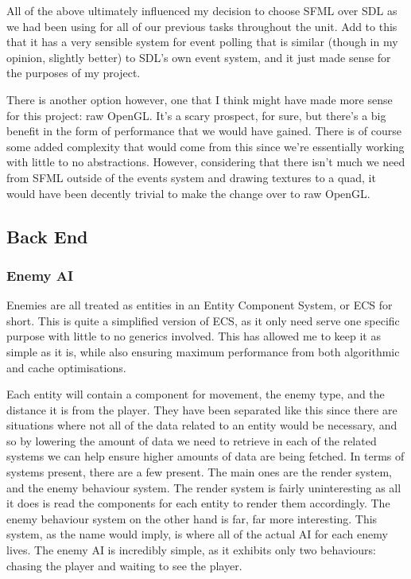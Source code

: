 \documentclass{article}
\begin{document}
All of the above ultimately influenced my decision to choose SFML over SDL as
we had been using for all of our previous tasks throughout the unit. Add to this
that it has a very sensible system for event polling that is similar (though in
my opinion, slightly better) to SDL's own event system, and it just made sense
for the purposes of my project.

There is another option however, one that I think might have made more sense for
this project: raw OpenGL. It's a scary prospect, for sure, but there's a big
benefit in the form of performance that we would have gained. There is of course
some added complexity that would come from this since we're essentially working
with little to no abstractions. However, considering that there isn't much we
need from SFML outside of the events system and drawing textures to a quad, it
would have been decently trivial to make the change over to raw OpenGL.

\subsection{Back End}

\subsubsection{Enemy AI}
Enemies are all treated as entities in an Entity Component System, or ECS for
short. This is quite a simplified version of ECS, as it only need serve one
specific purpose with little to no generics involved. This has allowed me to
keep it as simple as it is, while also ensuring maximum performance from both
algorithmic and cache optimisations.

Each entity will contain a component for movement, the enemy type, and the
distance it is from the player. They have been separated like this since there
are situations where not all of the data related to an entity would be
necessary, and so by lowering the amount of data we need to retrieve in each of
the related systems we can help ensure higher amounts of data are being fetched.
In terms of systems present, there are a few present. The main ones are the
render system, and the enemy behaviour system. The render system is fairly
uninteresting as all it does is read the components for each entity to render
them accordingly. The enemy behaviour system on the other hand is far, far more
interesting. This system, as the name would imply, is where all of the actual
AI for each enemy lives. The enemy AI is incredibly simple, as it exhibits only
two behaviours: chasing the player and waiting to see the player.
\end{document}
